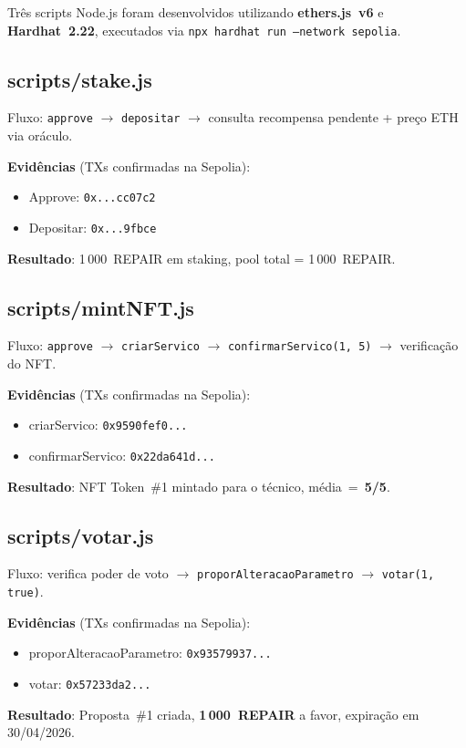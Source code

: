 \documentclass[
    12pt,
    a4paper,
    oneside,
    brazil,
    sumario=tradicional
]{abntex2}
\begin{document}
Três scripts Node.js foram desenvolvidos utilizando \textbf{ethers.js~v6}
e \textbf{Hardhat~2.22}, executados via
\texttt{npx hardhat run --network sepolia}.

\subsection{scripts/stake.js}

Fluxo: \texttt{approve} $\to$ \texttt{depositar} $\to$ consulta
recompensa pendente + preço ETH via oráculo.

\textbf{Evidências} (TXs confirmadas na Sepolia):
\begin{itemize}
    \item Approve: \texttt{0x...cc07c2}
    \item Depositar: \texttt{0x...9fbce}
\end{itemize}
\textbf{Resultado}: 1\,000~REPAIR em staking, pool total = 1\,000~REPAIR.

\subsection{scripts/mintNFT.js}

Fluxo: \texttt{approve} $\to$ \texttt{criarServico} $\to$
\texttt{confirmarServico(1, 5)} $\to$ verificação do NFT.

\textbf{Evidências} (TXs confirmadas na Sepolia):
\begin{itemize}
    \item criarServico: \texttt{0x9590fef0...}
    \item confirmarServico: \texttt{0x22da641d...}
\end{itemize}
\textbf{Resultado}: NFT Token~\#1 mintado para o técnico,
média~=~\textbf{5/5}.

\subsection{scripts/votar.js}

Fluxo: verifica poder de voto $\to$
\texttt{proporAlteracaoParametro} $\to$ \texttt{votar(1, true)}.

\textbf{Evidências} (TXs confirmadas na Sepolia):
\begin{itemize}
    \item proporAlteracaoParametro: \texttt{0x93579937...}
    \item votar: \texttt{0x57233da2...}
\end{itemize}
\textbf{Resultado}: Proposta~\#1 criada, \textbf{1\,000~REPAIR} a favor,
expiração em 30/04/2026.
\end{document}
